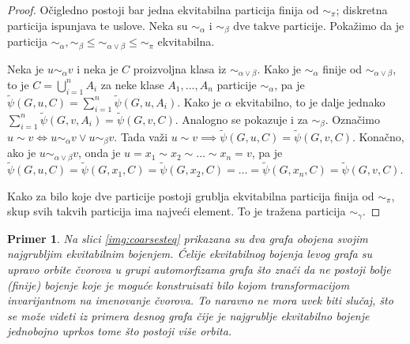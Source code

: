 \documentclass[12pt,oneside]{memoir}
\newtheorem{example}{Primer}
\theoremstyle{definition}
\begin{document}
  \begin{proof}
	  Očigledno postoji bar jedna ekvitabilna particija finija od $\sim_\pi$;
	  diskretna particija ispunjava te uslove.  Neka su $\sim_\alpha$ i
	  $\sim_\beta$ dve takve particije. Pokažimo da je particija
	  ${\sim_\alpha}, {\sim_\beta} \leq {\sim_{\alpha \lor \beta}} \leq
	  {\sim_\pi}$ ekvitabilna.

	  Neka je $u \sim_\alpha v$ i neka je $C$ proizvoljna klasa iz
	  $\sim_{\alpha \lor \beta}$. Kako je $\sim_\alpha$ finije od $\sim_{\alpha
	  \lor \beta}$, to je $C = \bigcup_{i=1}^n A_i$ za neke klase $A_1, \dots,
	  A_n$ particije $\sim_\alpha$, pa je $\widetilde{\psi}(G, u, C) =
	  \sum_{i=1}^n \widetilde{\psi}(G, u, A_i)$. Kako je $\alpha$ ekvitabilno,
	  to je dalje jednako $\sum_{i=1}^n \widetilde{\psi}(G, v, A_i) =
	  \widetilde{\psi}(G, v, C)$. Analogno se pokazuje i za $\sim_\beta$.
	  Označimo $u \sim v \iff u \sim_\alpha v \lor u \sim_\beta v$. Tada važi
	  $u \sim v \implies \widetilde{\psi}(G, u, C) = \widetilde{\psi}(G, v,
	  C)$.  Konačno, ako je $u \sim_{\alpha \lor \beta} v$, onda je $u = x_1
	  \sim x_2 \sim \dots \sim x_n = v$, pa je $\widetilde{\psi}(G, u, C) =
	  \widetilde{\psi}(G, x_1, C) = \widetilde{\psi}(G, x_2, C) = \dots =
	  \widetilde{\psi}(G, x_n, C) = \widetilde{\psi}(G, v, C)$.

	  Kako za bilo koje dve particije postoji grublja ekvitabilna particija
	  finija od $\sim_\pi$, skup svih takvih particija ima najveći element. To
	  je tražena particija $\sim_\gamma$.
  \end{proof}

  \begin{example}
	  Na slici \ref{img:coarsesteq} prikazana su dva grafa obojena svojim
	  najgrubljim ekvitabilnim bojenjem. Ćelije ekvitabilnog bojenja levog
	  grafa su upravo orbite čvorova u grupi automorfizama grafa što znači da
	  ne postoji bolje (finije) bojenje koje je moguće konstruisati bilo kojom
	  transformacijom invarijantnom na imenovanje čvorova. To naravno ne mora
	  uvek biti slučaj, što se može videti iz primera desnog grafa čije je
	  najgrublje ekvitabilno bojenje jednobojno uprkos tome što postoji više
	  orbita.
  \end{example}
\end{document}
